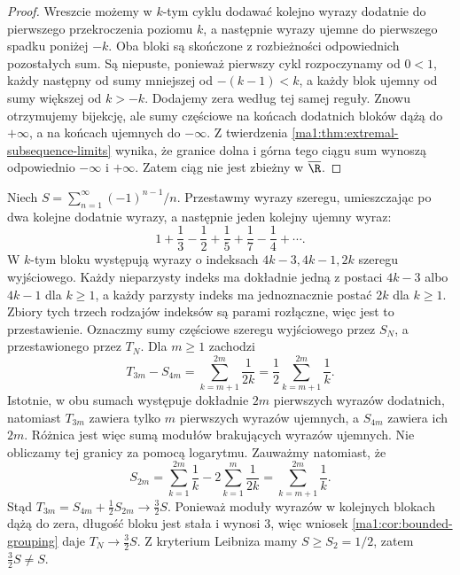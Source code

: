 \begin{proof}
Wreszcie możemy w $k$-tym cyklu dodawać kolejno wyrazy dodatnie do pierwszego przekroczenia poziomu $k$, a następnie wyrazy ujemne do pierwszego spadku poniżej $-k$. Oba bloki są skończone z rozbieżności odpowiednich pozostałych sum. Są niepuste, ponieważ pierwszy cykl rozpoczynamy od $0<1$, każdy następny od sumy mniejszej od $-(k-1)<k$, a każdy blok ujemny od sumy większej od $k>-k$. Dodajemy zera według tej samej reguły. Znowu otrzymujemy bijekcję, ale sumy częściowe na końcach dodatnich bloków dążą do $+\infty$, a na końcach ujemnych do $-\infty$. Z twierdzenia \ref{ma1:thm:extremal-subsequence-limits} wynika, że granice dolna i górna tego ciągu sum wynoszą odpowiednio $-\infty$ i $+\infty$. Zatem ciąg nie jest zbieżny w $\overline{\R}$.
\end{proof}

\begin{przyklad}
\label{ma1:ex:harmonic-rearrangement}
Niech $S=\sum_{n=1}^\infty(-1)^{n-1}/n$. Przestawmy wyrazy szeregu, umieszczając po dwa kolejne dodatnie wyrazy, a następnie jeden kolejny ujemny wyraz:
\[
 1+\frac13-\frac12+\frac15+\frac17-\frac14+\cdots.
\]
W $k$-tym bloku występują wyrazy o indeksach $4k-3,4k-1,2k$ szeregu wyjściowego. Każdy nieparzysty indeks ma dokładnie jedną z postaci $4k-3$ albo $4k-1$ dla $k\ge1$, a każdy parzysty indeks ma jednoznacznie postać $2k$ dla $k\ge1$. Zbiory tych trzech rodzajów indeksów są parami rozłączne, więc jest to przestawienie.
Oznaczmy sumy częściowe szeregu wyjściowego przez $S_N$, a przestawionego przez $T_N$. Dla $m\ge1$ zachodzi
\[
 T_{3m}-S_{4m}
 =\sum_{k=m+1}^{2m}\frac1{2k}
 =\frac12\sum_{k=m+1}^{2m}\frac1k.
\]
Istotnie, w obu sumach występuje dokładnie $2m$ pierwszych wyrazów dodatnich, natomiast $T_{3m}$ zawiera tylko $m$ pierwszych wyrazów ujemnych, a $S_{4m}$ zawiera ich $2m$. Różnica jest więc sumą modułów brakujących wyrazów ujemnych. Nie obliczamy tej granicy za pomocą logarytmu. Zauważmy natomiast, że
\[
 S_{2m}=\sum_{k=1}^{2m}\frac1k
 -2\sum_{k=1}^m\frac1{2k}
 =\sum_{k=m+1}^{2m}\frac1k.
\]
Stąd $T_{3m}=S_{4m}+\tfrac12 S_{2m}\to\tfrac32 S$. Ponieważ moduły wyrazów w kolejnych blokach dążą do zera, długość bloku jest stała i wynosi $3$, więc wniosek \ref{ma1:cor:bounded-grouping} daje $T_N\to\tfrac32 S$. Z kryterium Leibniza mamy $S\ge S_2=1/2$, zatem $\tfrac32 S\ne S$.
\end{przyklad}

